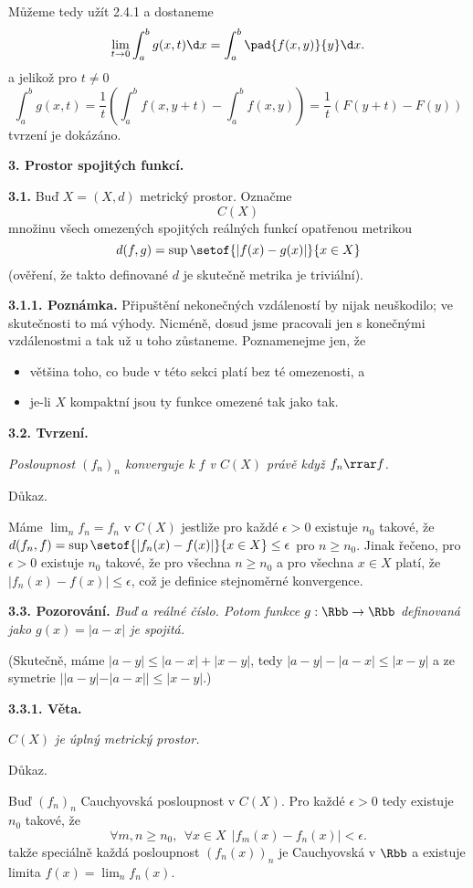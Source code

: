 \documentclass[12pt]{article}
\begin{document}
Můžeme tedy užít 2.4.1 a dostaneme
$$
	\lim_{t\to 0}\int_a^bg(x,t)\d x=\int_a^b\pad{f(x,y)}{y}\d x.
	$$
	a jelikož pro $t\neq 0$
	$$
	\int_a^bg(x,t)=\frac1t\left(\int_a^bf(x,y+t)-\int_a^bf(x,y)\right)=
	\frac1t(F(y+t)-F(y))
	$$ 
	tvrzení je dokázáno. \sq
						


 
 \vskip10mm
 
 {\large\bf 3. Prostor spojitých funkcí.}
 
 \bigskip
 
 {\bf 3.1.}	Buď $X=(X,d)$ metrický prostor. Označme
$$
C(X)
$$
množinu všech omezených spojitých reálných funkcí opatřenou metrikou
$$
d(f,g)=\sup\setof{|f(x)-g(x)|}{x\in X}
$$
(ověření, že takto definované $d$ je skutečně metrika je triviální).

\medskip

{\bf 3.1.1. Poznámka.} Připuštění nekonečných vzdáleností by nijak neuškodilo; ve skutečnosti to má výhody. 
Nicméně, dosud jsme pracovali jen s konečnými vzdálenostmi a tak už u toho zůstaneme. Poznamenejme jen, že
\begin{itemize}
\item většina toho, co bude v této sekci platí bez té omezenosti, a
\item je-li $X$ kompaktní jsou ty funkce omezené tak jako tak.
\end{itemize}

\bigskip

{\bf 3.2. Tvrzení.} {\em Posloupnost $(f_n)_n$ konverguje k $f$ v $C(X)$ právě když $f_n\rrar f$.

Důkaz.} Máme $\lim_nf_n=f_n$ v $C(X)$ jestliže pro každé $\epsilon>0$ existuje $n_0$ takové, že $d(f_n,f)=\sup\setof{|f_n(x)-f(x)|}{x\in X}\leq\epsilon$ pro $n\geq n_0$.
Jinak řečeno, pro $\epsilon>0$ existuje $n_0$ takové, že 
pro všechna $n\geq n_0$ a pro všechna $x\in X$ platí, že $|f_n(x)-f(x)|\leq\epsilon$, což je definice stejnoměrné konvergence. \sq

\bigskip

{\bf 3.3. Pozorování.} {\em Buď $a$ reálné číslo. Potom funkce $g:\Rbb\to \Rbb$  definovaná jako $g(x)=|a-x|$ je spojitá.}

(Skutečně, máme $|a-y|\leq |a-x|+|x-y|$, tedy $|a-y|-|a-x|\leq |x-y|$ a ze symetrie $||a-y|-|a-x||\leq |x-y|$.)

\medskip

{\bf 3.3.1. Věta.} {\em $C(X)$ je úplný metrický prostor.

Důkaz.} Buď $(f_n)_n$ Cauchyovská posloupnost v $C(X)$. Pro každé $\epsilon>0$ tedy existuje $n_0$ takové, že
\begin{equation}
\forall m,n\geq n_0, \ \ \forall x\in X \ \  |f_m(x)-f_n(x)|<\epsilon. \tag{$*$}
\end{equation}
takže speciálně každá posloupnost $(f_n(x))_n$ je Cauchyovská v $\Rbb$ a existuje limita $f(x)=\lim_nf_n(x)$. 
\end{document}

